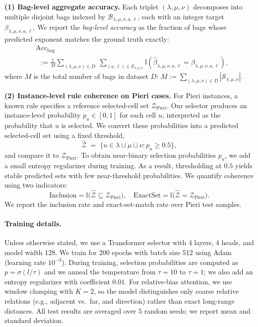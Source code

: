 \documentclass{article}
\theoremstyle{plain}
\theoremstyle{definition}
\theoremstyle{remark}
\begin{document}
\textbf{(1) Bag-level aggregate accuracy.}
Each triplet $(\lambda,\mu,\nu)$ decomposes into multiple disjoint bags indexed by $ \mathcal{B}_{\lambda, \mu, \nu, a,\ell}$, each with an integer target $\beta_{\lambda,\mu,\nu,a,\ell}$.
We report the \emph{bag-level accuracy} as the fraction of bags whose predicted exponent matches the ground truth exactly:
\begin{align*}
&\mathrm{Acc}_{\mathrm{bag}}\\
&~~:= \frac{1}{M}\sum_{(\lambda,\mu,\nu)\in D}\ \sum_{(a,\ell)\in \mathcal S_{\lambda,\mu,\nu}}
\mathbb{I}\!\left(\widehat{\beta}_{\lambda,\mu,\nu,a,\ell}=\beta_{\lambda,\mu,\nu,a,\ell}\right),
\end{align*}
where $M$ is the total number of bags in dataset $D$:
\( M:= \sum_{(\lambda,\mu,\nu)\in D}\left|\mathcal S_{\lambda,\mu,\nu}\right|. \)


\textbf{(2) Instance-level rule coherence on Pieri cases.}
For Pieri instances, a known rule specifies a reference selected-cell set $\mathcal{Z}_{\text{Pieri}}$.
Our selector produces an instance-level probability $p_u \in [0,1]$ for each cell $u$, interpreted as the probability that $u$ is selected.
We convert these probabilities into a predicted selected-cell set using a fixed threshold,
\[
\hat{\mathcal{Z}} \;=\; \{u \in\lambda\sqcup\mu\sqcup\nu : p_u \ge 0.5\},
\]
and compare it to $\mathcal{Z}_{\text{Pieri}}$.
To obtain near-binary selection probabilities $p_u$, we add a small entropy regularizer during training.
As a result, thresholding at $0.5$ yields stable predicted sets with few near-threshold probabilities.
We quantify coherence using two indicators:
\[
\text{Inclusion} = \mathbb{I}\big(\hat{\mathcal{Z}} \subseteq \mathcal{Z}_{\text{Pieri}}\big), \quad
\text{ExactSet} = \mathbb{I}\big(\hat{\mathcal{Z}} = \mathcal{Z}_{\text{Pieri}}\big).
\]
We report the inclusion rate and exact-set-match rate over Pieri test samples.

\paragraph{Training details.}
Unless otherwise stated, we use a Transformer selector with 4 layers, 4 heads, and model width 128.
We train for 200 epochs with batch size 512 using Adam (learning rate $10^{-3}$).
During training, selection probabilities are computed as $p=\sigma(l/\tau)$ and we anneal the temperature from $\tau=10$ to $\tau=1$; we also add an entropy regularizer with coefficient $0.01$.
For relative-bias attention, we use window clamping with $K=2$, so the model distinguishes only coarse relative relations (e.g., adjacent vs.\ far, and direction) rather than exact long-range distances.
All test results are averaged over 5 random seeds; we report mean and standard deviation.
\end{document}
